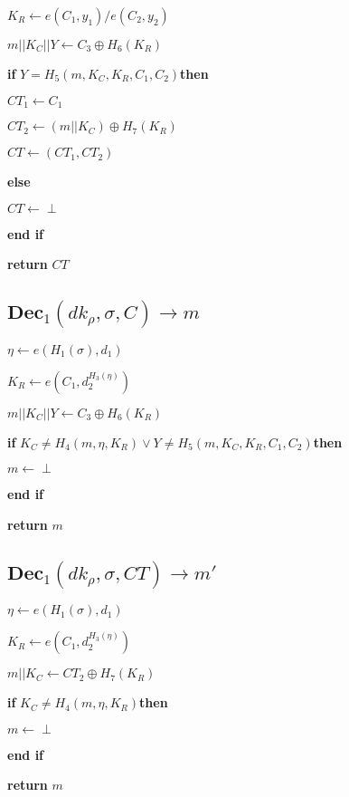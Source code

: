 \documentclass[a4paper]{article}
\begin{document}
$K_R \gets e(C_1, y_1) / e(C_2, y_2)$

$m || K_C || Y \gets C_3 \oplus H_6(K_R)$

\textbf{if} $Y = H_5(m, K_C, K_R, C_1, C_2) $\textbf{then}

$\textit{CT}_1 \gets C_1$

$\textit{CT}_2 \gets (m || K_C) \oplus H_7(K_R)$

$\textit{CT} \gets (\textit{CT}_1, \textit{CT}_2)$

\textbf{else}

\quad$\textit{CT} \gets \perp$

\textbf{end if}

\textbf{return} $\textit{CT}$

\subsection{$\textbf{Dec}_1(\textit{dk}_\rho, \sigma, C) \rightarrow m$}

$\eta \gets e(H_1(\sigma), d_1)$

$K_R \gets e(C_1, d_2^{H_3(\eta)})$

$m || K_C || Y \gets C_3 \oplus H_6(K_R)$

\textbf{if} $K_C \neq H_4(m, \eta, K_R) \lor Y \neq H_5(m, K_C, K_R, C_1, C_2) $\textbf{then}

\quad$m \gets \perp$

\textbf{end if}

\textbf{return} $m$

\subsection{$\textbf{Dec}_1(\textit{dk}_\rho, \sigma, \textit{CT}) \rightarrow m'$}

$\eta \gets e(H_1(\sigma), d_1)$

$K_R \gets e(C_1, d_2^{H_3(\eta)})$

$m || K_C \gets \textit{CT}_2 \oplus H_7(K_R)$

\textbf{if} $K_C \neq H_4(m, \eta, K_R) $\textbf{then}

\quad$m \gets \perp$

\textbf{end if}

\textbf{return} $m$
\end{document}
